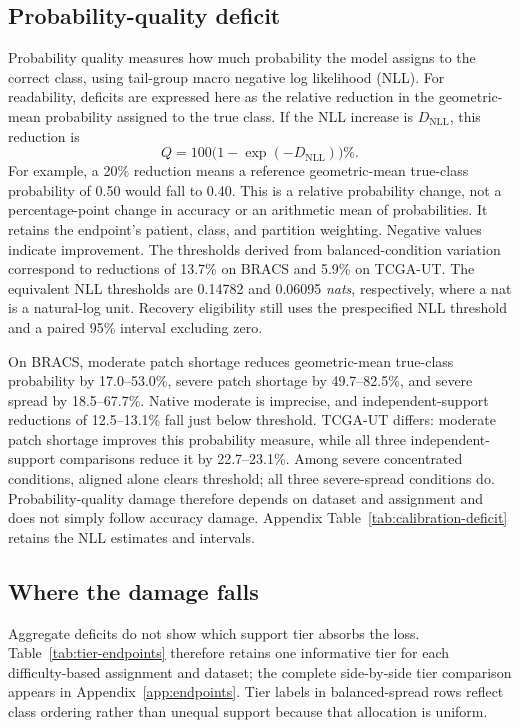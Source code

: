 \documentclass[11pt]{article}
\begin{document}
\subsection{Probability-quality deficit}
\label{sec:rq1-calibration}
Probability quality measures how much probability the model assigns to the correct class, using tail-group macro negative log likelihood (NLL). For readability, deficits are expressed here as the relative reduction in the geometric-mean probability assigned to the true class. If the NLL increase is $D_{\mathrm{NLL}}$, this reduction is
\begin{equation}
  Q = 100\bigl(1-\exp(-D_{\mathrm{NLL}})\bigr)\%.
\end{equation}
\noindent For example, a \num{20}\% reduction means a reference geometric-mean true-class probability of \num{0.50} would fall to \num{0.40}. This is a relative probability change, not a percentage-point change in accuracy or an arithmetic mean of probabilities. It retains the endpoint's patient, class, and partition weighting. Negative values indicate improvement. The thresholds derived from balanced-condition variation correspond to reductions of \num{13.7}\% on BRACS and \num{5.9}\% on TCGA-UT. The equivalent NLL thresholds are \num{0.14782} and \num{0.06095} \emph{nats}, respectively, where a nat is a natural-log unit. Recovery eligibility still uses the prespecified NLL threshold and a paired \num{95}\% interval excluding zero.

On BRACS, moderate patch shortage reduces geometric-mean true-class probability by \num{17.0}--\num{53.0}\%, severe patch shortage by \num{49.7}--\num{82.5}\%, and severe spread by \num{18.5}--\num{67.7}\%. Native moderate is imprecise, and independent-support reductions of \num{12.5}--\num{13.1}\% fall just below threshold. TCGA-UT differs: moderate patch shortage improves this probability measure, while all three independent-support comparisons reduce it by \num{22.7}--\num{23.1}\%. Among severe concentrated conditions, aligned alone clears threshold; all three severe-spread conditions do. Probability-quality damage therefore depends on dataset and assignment and does not simply follow accuracy damage. Appendix Table~\ref{tab:calibration-deficit} retains the NLL estimates and intervals.

\subsection{Where the damage falls}
\label{sec:rq1-incidence}
Aggregate deficits do not show which support tier absorbs the loss. Table~\ref{tab:tier-endpoints} therefore retains one informative tier for each difficulty-based assignment and dataset; the complete side-by-side tier comparison appears in Appendix~\ref{app:endpoints}. Tier labels in balanced-spread rows reflect class ordering rather than unequal support because that allocation is uniform.
\end{document}
